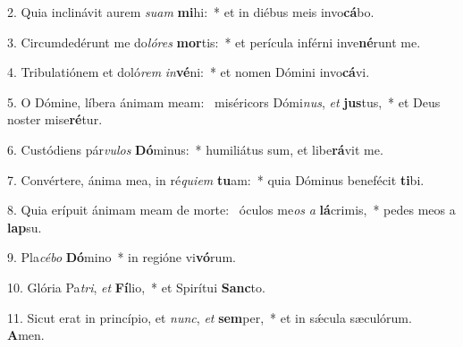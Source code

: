 2. Quia inclinávit aurem \textit{su}\textit{am} \textbf{mi}hi:~*  et in diébus meis invo\textbf{cá}bo.\

3. Circumdedérunt me do\textit{ló}\textit{res} \textbf{mor}tis:~*  et perícula inférni inve\textbf{né}runt me.\

4. Tribulatiónem et doló\textit{rem} \textit{in}\textbf{vé}ni:~*  et nomen Dómini invo\textbf{cá}vi.\

5. O Dómine, líbera ánimam meam: \dag\  miséricors Dómi\textit{nus}, \textit{et} \textbf{jus}tus,~*  et Deus noster mise\textbf{ré}tur.\

6. Custódiens pár\textit{vu}\textit{los} \textbf{Dó}minus:~*  humiliátus sum, et libe\textbf{rá}vit me.\

7. Convértere, ánima mea, in ré\textit{qui}\textit{em} \textbf{tu}am:~*  quia Dóminus benefécit \textbf{ti}bi.\

8. Quia erípuit ánimam meam de morte: \dag\  óculos me\textit{os} \textit{a} \textbf{lá}crimis,~*  pedes meos a \textbf{lap}su.\

9. Pla\textit{cé}\textit{bo} \textbf{Dó}mino~*  in regióne vi\textbf{vó}rum.\

10. Glória Pa\textit{tri}, \textit{et} \textbf{Fí}lio,~*  et Spirítui \textbf{Sanc}to.\

11. Sicut erat in princípio, et \textit{nunc}, \textit{et} \textbf{sem}per,~*  et in sǽcula sæculórum. \textbf{A}men.\

